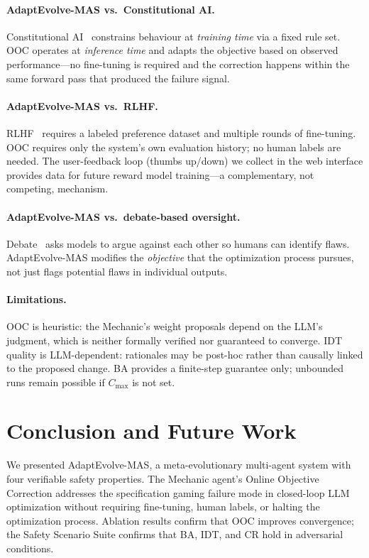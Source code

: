 \documentclass[letterpaper]{article}
\begin{document}
\paragraph{AdaptEvolve-MAS vs.\ Constitutional AI.}
Constitutional AI~\cite{bai2022} constrains behaviour at \emph{training
time} via a fixed rule set.  OOC operates at \emph{inference time} and
adapts the objective based on observed performance---no fine-tuning is
required and the correction happens within the same forward pass that
produced the failure signal.

\paragraph{AdaptEvolve-MAS vs.\ RLHF.}
RLHF~\cite{ouyang2022} requires a labeled preference dataset and multiple
rounds of fine-tuning.  OOC requires only the system's own evaluation
history; no human labels are needed.  The user-feedback loop (thumbs
up/down) we collect in the web interface provides data for future reward
model training---a complementary, not competing, mechanism.

\paragraph{AdaptEvolve-MAS vs.\ debate-based oversight.}
Debate~\cite{irving2018} asks models to argue against each other so
humans can identify flaws.  AdaptEvolve-MAS modifies the \emph{objective}
that the optimization process pursues, not just flags potential flaws
in individual outputs.

\paragraph{Limitations.}
OOC is heuristic: the Mechanic's weight proposals depend on the LLM's
judgment, which is neither formally verified nor guaranteed to converge.
IDT quality is LLM-dependent: rationales may be post-hoc rather than
causally linked to the proposed change.
BA provides a finite-step guarantee only; unbounded runs remain possible
if $C_{\max}$ is not set.

\section{Conclusion and Future Work}

We presented AdaptEvolve-MAS, a meta-evolutionary multi-agent system with four
verifiable safety properties.  The Mechanic agent's Online Objective
Correction addresses the specification gaming failure mode in closed-loop
LLM optimization without requiring fine-tuning, human labels, or halting
the optimization process.  Ablation results confirm that OOC improves
convergence; the Safety Scenario Suite confirms that BA, IDT, and CR
hold in adversarial conditions.
\end{document}
